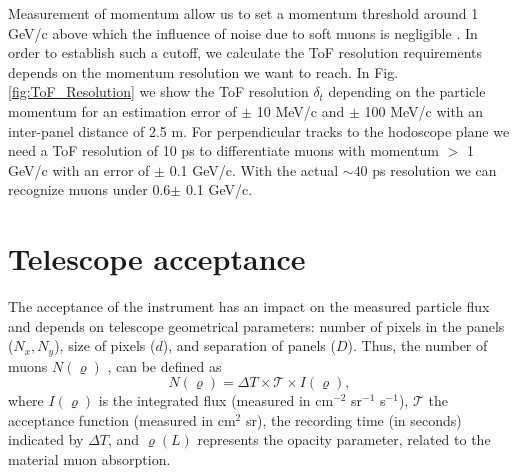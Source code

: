 \documentclass[letterpaper,11pt]{article}
\begin{document}
Measurement of momentum allow us to set a momentum threshold around 1 GeV/c above which the influence of noise due to soft muons is negligible \cite{nishiyama2016monte, nishiyama2014experimental, Olh2018, Olh2017, ambrosino2015joint}. In order to establish such a cutoff, we calculate the ToF resolution requirements depends on the momentum resolution we want to reach. In Fig. \ref{fig:ToF_Resolution} we show the ToF resolution $\delta_t$ depending on the particle momentum for an estimation error of $\pm$ 10 MeV/c and $\pm$ 100 MeV/c with an inter-panel distance of 2.5 m. For perpendicular tracks to the hodoscope plane we need a ToF resolution of 10 ps to differentiate muons with momentum $>$ 1 GeV/c with an error of $\pm$ 0.1 GeV/c. With the actual $\sim 40$ ps resolution we can recognize muons under 0.6$\pm$ 0.1 GeV/c.



\section{Telescope acceptance}
\label{acceptan}
The acceptance of the instrument has an impact on the measured particle flux and depends on telescope geometrical  parameters: number of pixels in the panels ($N_x, N_y$), size of pixels ($d$), and separation of panels ($D$). Thus, the number of muons $N(\varrho)$ \cite{LesparreEtal2010}, can be defined as
\begin{equation}
N(\varrho)=\Delta T \times \mathcal{T}\times I(\varrho), \label{Nmuons}
\end{equation}
where $I(\varrho)$ is the integrated flux (measured in cm$^{-2}$ sr$^{-1}$ s$^{-1}$), $\mathcal{T}$ the acceptance function (measured in cm$^{2}$ sr), the recording time (in seconds) indicated by $\Delta T$, and $\varrho(L)$ represents the opacity parameter, related to the material muon absorption.
\end{document}
